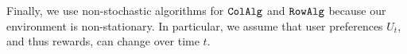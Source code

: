

Finally, we use non-stochastic algorithms for ${\tt ColAlg}$ and ${\tt RowAlg}$ because our environment is non-stationary. In particular, we assume that user preferences $U_t$, and thus rewards, can change over time $t$. 
